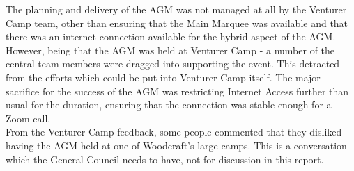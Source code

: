 The planning and delivery of the AGM was not managed at all by the Venturer Camp team, other than ensuring that the Main Marquee was available and that there was an internet connection available for the hybrid aspect of the AGM. However, being that the AGM was held at Venturer Camp - a number of the central team members were dragged into supporting the event. This detracted from the efforts which could be put into Venturer Camp itself. The major sacrifice for the success of the AGM was restricting Internet Access further than usual for the duration, ensuring that the connection was stable enough for a Zoom call.\\

From the Venturer Camp feedback, some people commented that they disliked having the AGM held at one of Woodcraft's large camps. This is a conversation which the General Council needs to have, not for discussion in this report. 
